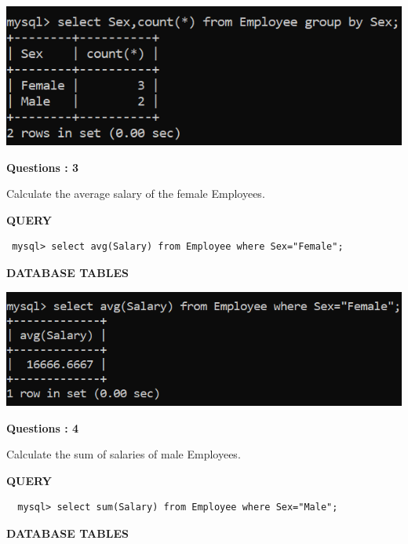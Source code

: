 \documentclass[a4paper,12pt]{report}
\begin{document}
\includegraphics[scale=0.7]{Screenshot (461).png}
\begin{flushleft}
    \textbf{Questions : 3}
\end{flushleft}
Calculate the average salary of  the  female Employees.
	\begin{flushleft}
		\textbf{QUERY }
	\end{flushleft}
 \begin{verbatim}
 mysql> select avg(Salary) from Employee where Sex="Female";    
 \end{verbatim}
\begin{flushleft}
		\textbf{DATABASE TABLES} 
\end{flushleft} 

\includegraphics[scale=0.6]{Screenshot (462).png}
\begin{flushleft}
    \textbf{Questions : 4}
\end{flushleft}
Calculate the sum of salaries of male Employees.
	\begin{flushleft}
		\textbf{QUERY }
	\end{flushleft}
 \begin{verbatim}
  mysql> select sum(Salary) from Employee where Sex="Male";
 \end{verbatim}
\begin{flushleft}
		\textbf{DATABASE TABLES} 
\end{flushleft} 
\end{document}
